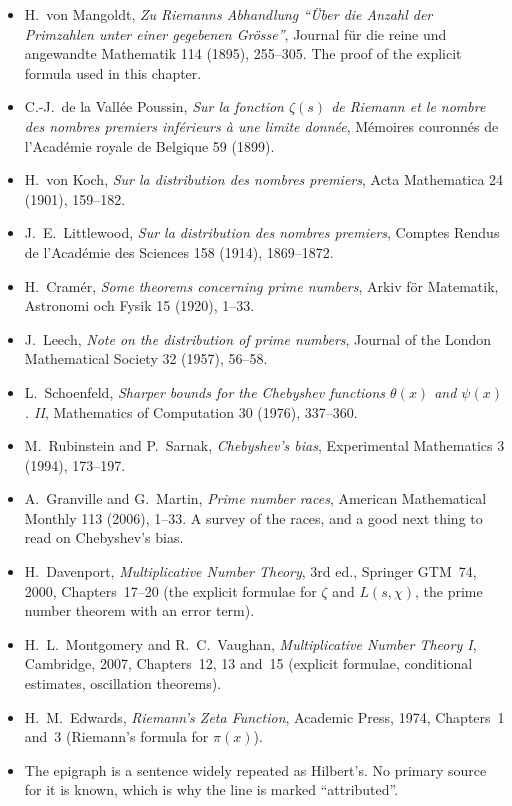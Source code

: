 \begin{itemize}
\item H.~von Mangoldt, \emph{Zu Riemanns Abhandlung ``\"Uber die Anzahl der Primzahlen unter einer gegebenen Gr\"osse''}, Journal f\"ur die reine und angewandte Mathematik 114 (1895), 255--305. The proof of the explicit formula used in this chapter.
\item C.-J.~de la Vall\'ee Poussin, \emph{Sur la fonction $\zeta(s)$ de Riemann et le nombre des nombres premiers inf\'erieurs \`a une limite donn\'ee}, M\'emoires couronn\'es de l'Acad\'emie royale de Belgique 59 (1899).
\item H.~von Koch, \emph{Sur la distribution des nombres premiers}, Acta Mathematica 24 (1901), 159--182.
\item J.~E.~Littlewood, \emph{Sur la distribution des nombres premiers}, Comptes Rendus de l'Acad\'emie des Sciences 158 (1914), 1869--1872.
\item H.~Cram\'er, \emph{Some theorems concerning prime numbers}, Arkiv f\"or Matematik, Astronomi och Fysik 15 (1920), 1--33.
\item J.~Leech, \emph{Note on the distribution of prime numbers}, Journal of the London Mathematical Society 32 (1957), 56--58.
\item L.~Schoenfeld, \emph{Sharper bounds for the Chebyshev functions $\theta(x)$ and $\psi(x)$. II}, Mathematics of Computation 30 (1976), 337--360.
\item M.~Rubinstein and P.~Sarnak, \emph{Chebyshev's bias}, Experimental Mathematics 3 (1994), 173--197.
\item A.~Granville and G.~Martin, \emph{Prime number races}, American Mathematical Monthly 113 (2006), 1--33. A survey of the races, and a good next thing to read on Chebyshev's bias.
\item H.~Davenport, \emph{Multiplicative Number Theory}, 3rd ed., Springer GTM~74, 2000, Chapters~17--20 (the explicit formulae for $\zeta$ and $L(s,\chi)$, the prime number theorem with an error term).
\item H.~L.~Montgomery and R.~C.~Vaughan, \emph{Multiplicative Number Theory I}, Cambridge, 2007, Chapters~12, 13 and~15 (explicit formulae, conditional estimates, oscillation theorems).
\item H.~M.~Edwards, \emph{Riemann's Zeta Function}, Academic Press, 1974, Chapters~1 and~3 (Riemann's formula for $\pi(x)$).
\item The epigraph is a sentence widely repeated as Hilbert's. No primary source for it is known, which is why the line is marked ``attributed''.
\end{itemize}

